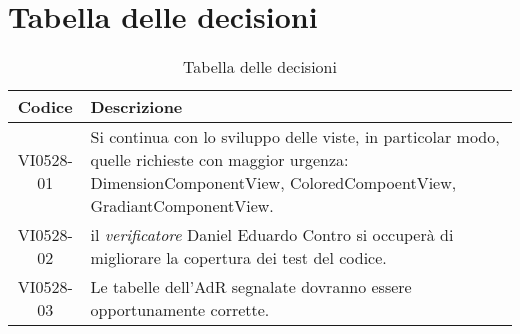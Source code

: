 \documentclass{article}
\begin{document}
\section{Tabella delle decisioni}%
\label{sub:decisioni}

\begin{table}[!ht]
	\centering
	\begin{tabular}{|c|p{13cm}|}
		\hline
		\rowcolor{lightgray}
		\textbf{Codice} & \textbf{Descrizione} \\
		\hline
			VI0528-01 & Si continua con lo sviluppo delle viste, in particolar modo, quelle richieste con maggior urgenza: DimensionComponentView, ColoredCompoentView, GradiantComponentView. \\
            VI0528-02 & il \emph{verificatore} Daniel Eduardo Contro si occuperà di migliorare la copertura dei test del codice. \\
			VI0528-03 & Le tabelle dell'AdR segnalate dovranno essere opportunamente corrette. \\
		\hline
	\end{tabular}
	\caption{Tabella delle decisioni}
\end{table}
\end{document}
